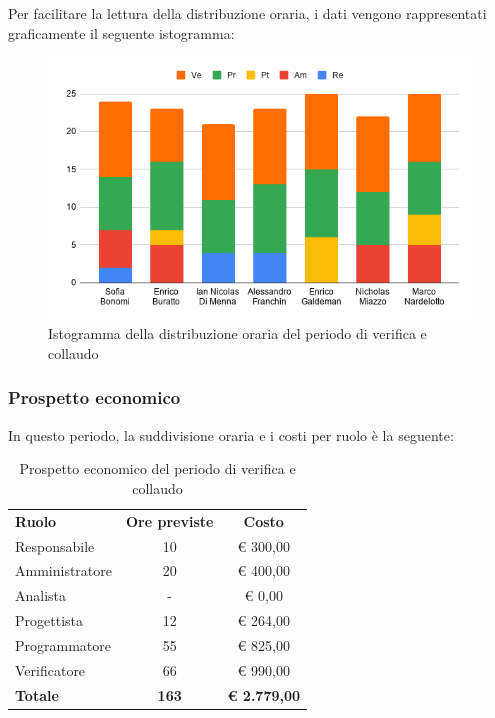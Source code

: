 \documentclass[../piano-di-progetto.tex]{subfiles}
\begin{document}
  Per facilitare la lettura della distribuzione oraria, i dati vengono rappresentati graficamente il seguente istogramma:
  \begin{figure}[H]
    \centering
    \includegraphics[width=12cm]{img/ore-verifica.png}
    \caption{Istogramma della distribuzione oraria del periodo di verifica e collaudo}
    \label{fig:ore-componente-verifica}
  \end{figure}

  \subsubsection{Prospetto economico}
  In questo periodo, la suddivisione oraria e i costi per ruolo è la seguente:

  \begin{table}[H]
    \centering
    \begin{tabular}{lcc}
      \rowcolor{lightgray}
      \textbf{Ruolo}  & \textbf{Ore previste} & \textbf{Costo}  \\
      Responsabile    & 10           & € 300,00            \\
      Amministratore  & 20           & € 400,00            \\
      Analista        & -            & € 0,00              \\
      Progettista     & 12           & € 264,00            \\
      Programmatore   & 55           & € 825,00            \\
      Verificatore    & 66           & € 990,00            \\
      \textbf{Totale} & \textbf{163} & \textbf{€ 2.779,00}
    \end{tabular}
    \caption{Prospetto economico del periodo di verifica e collaudo}
  \end{table}
\end{document}
